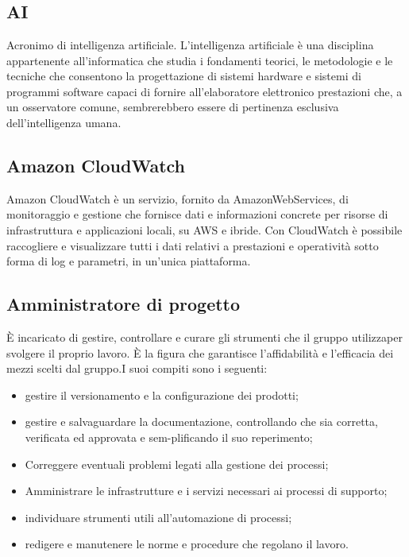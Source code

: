 \section{}
\subsection* {AI} Acronimo di intelligenza artificiale. L'intelligenza artificiale è una disciplina appartenente all'informatica che studia i fondamenti teorici, le metodologie e le tecniche che consentono la progettazione di sistemi hardware e sistemi di programmi software capaci di fornire all'elaboratore elettronico prestazioni che, a un osservatore comune, sembrerebbero essere di pertinenza esclusiva dell’intelligenza umana.

\subsection*{Amazon CloudWatch} Amazon CloudWatch è un servizio, fornito da AmazonWebServices, di monitoraggio e gestione che fornisce dati e informazioni concrete per risorse di infrastruttura e applicazioni locali, su AWS e ibride. Con CloudWatch è possibile raccogliere e visualizzare tutti i dati relativi a prestazioni e operatività sotto forma di log e parametri, in un'unica piattaforma.

\subsection*{Amministratore di progetto} È incaricato di gestire, controllare e curare gli strumenti che il gruppo utilizzaper svolgere il proprio lavoro. È la figura che garantisce l’affidabilità e l’efficacia dei mezzi scelti dal gruppo.I suoi compiti sono i seguenti:
\begin{itemize}
    \item gestire il versionamento e la configurazione dei prodotti;
    \item gestire e salvaguardare la documentazione, controllando che sia corretta, verificata ed approvata e sem-plificando il suo reperimento;
    \item Correggere eventuali problemi legati alla gestione dei processi;
    \item Amministrare le infrastrutture e i servizi necessari ai processi di supporto;
    \item individuare strumenti utili all’automazione di processi;
    \item redigere e manutenere le norme e procedure che regolano il lavoro.
\end{itemize}

